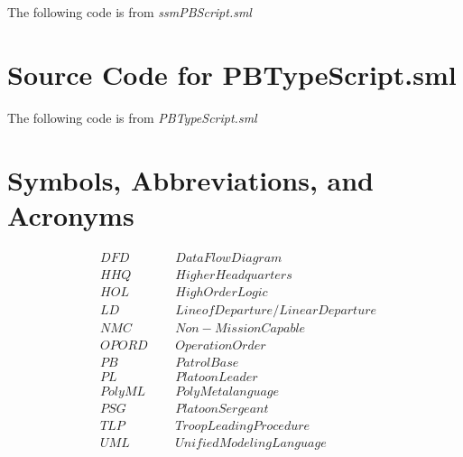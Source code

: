 The following code is from \emph{ssmPBScript.sml}


\chapter{Source Code for PBTypeScript.sml}
\label{cha:source-code-pbtyp}

The following code is from \emph{PBTypeScript.sml}


\chapter{Symbols, Abbreviations, and Acronyms}
\label{cha:symb-abbr-acronyms}

\begin{align*}
&DFD\;\;\;\;\;&Data Flow Diagram\ \\
&HHQ\;\;\;\;\;&Higher Headquarters\ \\ 
&HOL\;\;\;\;\;&High Order Logic\ \\
&LD\;\;\;\;\;&Line of Departure/Linear Departure\ \\
&NMC\;\;\;\;\;&Non-Mission Capable\ \\
&OPORD\;\;\;\;\;&Operation Order\ \\
&PB\;\;\;\;\;&Patrol Base\ \\
&PL\;\;\;\;\;&Platoon Leader\ \\
&PolyML\;\;\;\;\;&Poly Metalanguage\ \\
&PSG\;\;\;\;\;&Platoon Sergeant\ \\
&TLP\;\;\;\;\;&Troop Leading Procedure\ \\
&UML\;\;\;\;\;&Unified Modeling Language\ \\
\end{align*}